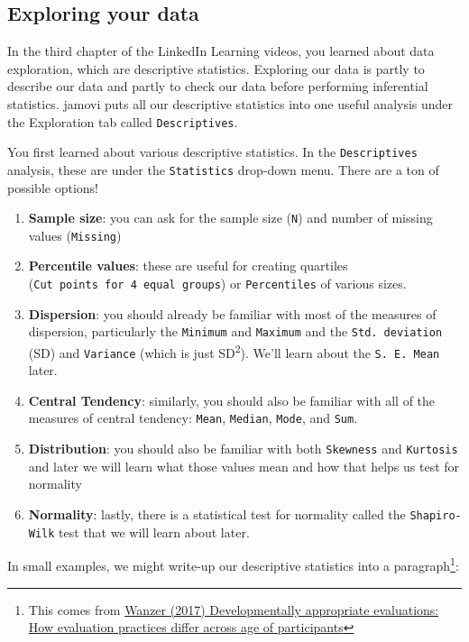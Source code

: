 \documentclass[
]{book}
\providecommand{\tightlist}{%
  \setlength{\itemsep}{0pt}\setlength{\parskip}{0pt}}
\begin{document}
\hypertarget{exploring-your-data}{%
\subsection{Exploring your data}\label{exploring-your-data}}

In the third chapter of the LinkedIn Learning videos, you learned about data exploration, which are descriptive statistics. Exploring our data is partly to describe our data and partly to check our data before performing inferential statistics. jamovi puts all our descriptive statistics into one useful analysis under the Exploration tab called \texttt{Descriptives}.

You first learned about various descriptive statistics. In the \texttt{Descriptives} analysis, these are under the \texttt{Statistics} drop-down menu. There are a ton of possible options!

\begin{enumerate}
\def\labelenumi{\arabic{enumi}.}
\tightlist
\item
  \textbf{Sample size}: you can ask for the sample size (\texttt{N}) and number of missing values (\texttt{Missing})
\item
  \textbf{Percentile values}: these are useful for creating quartiles (\texttt{Cut\ points\ for\ 4\ equal\ groups}) or \texttt{Percentiles} of various sizes.
\item
  \textbf{Dispersion}: you should already be familiar with most of the measures of dispersion, particularly the \texttt{Minimum} and \texttt{Maximum} and the \texttt{Std.\ deviation} (SD) and \texttt{Variance} (which is just SD\textsuperscript{2}). We'll learn about the \texttt{S.\ E.\ Mean} later.
\item
  \textbf{Central Tendency}: similarly, you should also be familiar with all of the measures of central tendency: \texttt{Mean}, \texttt{Median}, \texttt{Mode}, and \texttt{Sum}.
\item
  \textbf{Distribution}: you should also be familiar with both \texttt{Skewness} and \texttt{Kurtosis} and later we will learn what those values mean and how that helps us test for normality
\item
  \textbf{Normality}: lastly, there is a statistical test for normality called the \texttt{Shapiro-Wilk} test that we will learn about later.
\end{enumerate}

In small examples, we might write-up our descriptive statistics into a paragraph\footnote{This comes from \href{https://thesiscommons.org/bk57d/}{Wanzer (2017) Developmentally appropriate evaluations: How evaluation practices differ across age of participants}}:
\end{document}
